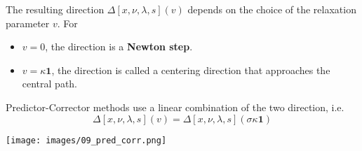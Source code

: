 \newpar{}
The resulting direction $\Delta [x,\nu,\lambda,s](v)$ depends on the choice of the relaxation parameter $v$.
For
\begin{itemize}
    \item $v=0$, the direction is a \textbf{Newton step}.
    \item $v=\kappa \mathbf{1}$, the direction is called a centering direction that approaches the central path.
\end{itemize}

\newpar{}

Predictor-Corrector methods use a linear combination of the two direction, i.e.\
\begin{equation*}
    \Delta [x,\nu,\lambda,s](v) =\Delta [x,\nu,\lambda,s](\sigma\kappa \mathbf{1})
\end{equation*}
\begin{center}
    \texttt{[image: images/09\_pred\_corr.png]}
\end{center}